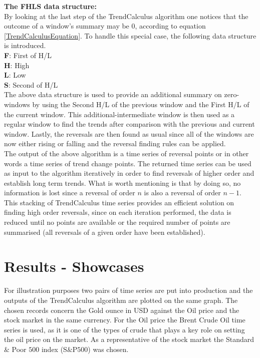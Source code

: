 \documentclass[a4, 11pt]{article}
\begin{document}
\textbf{The FHLS data structure:}\\
By looking at the last step of the TrendCalculus algorithm one notices that the outcome of a window's summary may be $0$, according to equation \ref{TrendCalculusEquation}. To handle this special case, the following data structure is introduced. \\
\textbf{F}: First of H/L\\
\textbf{H}: High\\
\textbf{L}: Low\\
\textbf{S}: Second of H/L\\[2ex]
The above data structure is used to provide an additional summary on zero-windows by using the Second H/L of the previous window and the First H/L of the current window. This additional-intermediate window is then used as a regular window to find the trends after comparison with the previous and current window. Lastly, the reversals are then found as usual since all of the windows are now either rising or falling and the reversal finding rules can be applied. \\[2ex]
The output of the above algorithm is a time series of reversal points or in other words a time series of trend change points. The returned time series can be used as input to the algorithm iteratively in order to find reversals of higher order and establish long term trends. What is worth mentioning is that by doing so, no information is lost since a reversal of order $n$ is also a reversal of order $n-1$. This stacking of TrendCalculus time series provides an efficient solution on finding high order reversals, since on each iteration performed, the data is reduced until no points are available or the required number of points are summarised (all reversals of a given order have been established). 


\section{Results - Showcases}
For illustration purposes two pairs of time series are put into production and the outputs of the TrendCalculus algorithm are plotted on the same graph. The chosen records concern the Gold ounce in USD against the Oil price and the stock market in the same currency. For the Oil price the Brent Crude Oil time series is used, as it is one of the types of crude that plays a key role on setting the oil price on the market. As a representative of the stock market the Standard $\&$ Poor $500$ index (S$\&$P$500$) was chosen. 
\end{document}
